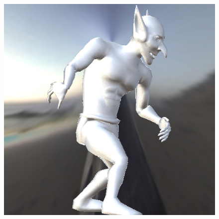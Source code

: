 \begin{figure}[H]
\endminipage\hfill
{}%
  \includegraphics[width=\linewidth]{./Imagens/brdfs/edwards-2006-goblin.png}
\endminipage
\end{figure}

